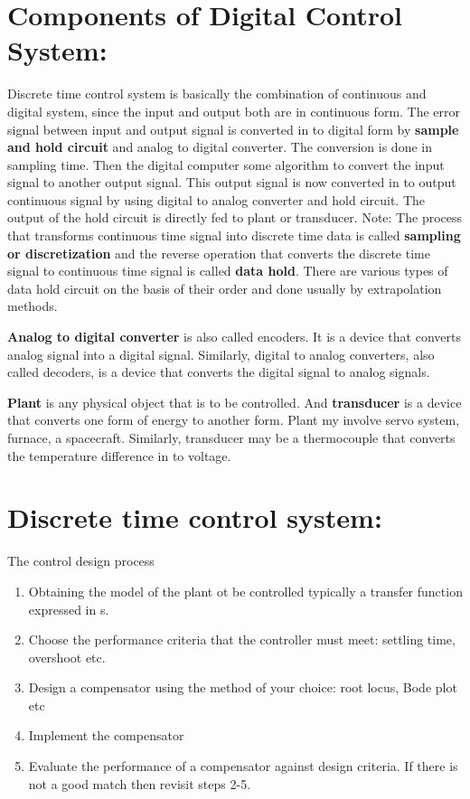 \documentclass{article}
\begin{document}
\section{Components of Digital Control System:}
Discrete time control system is basically the combination of continuous and digital system, since the input and output both are in continuous form. The error signal between input and output signal is converted in to digital form by \textbf{sample and hold circuit} and analog to digital converter. The conversion is done in sampling time. Then the digital computer some algorithm to convert the input signal to another output signal. This output signal is now converted in to output continuous signal by using digital to analog converter and hold circuit. The output of the hold circuit is directly fed to plant or transducer.
Note: The process that transforms continuous time signal into discrete time data is called \textbf{sampling or discretization} and the reverse operation that converts the discrete time signal to continuous time signal is called \textbf{data hold}. There are various types of data hold circuit on the basis of their order and done usually by extrapolation methods.

\textbf{Analog to digital converter} is also called encoders. It is a device that converts analog signal into a digital signal. Similarly, digital to analog converters, also called decoders, is a device that converts the digital signal to analog signals.

\textbf{Plant} is any physical object that is to be controlled. And \textbf{transducer} is a device that converts one form of energy to another form. Plant my involve servo system, furnace, a spacecraft. Similarly, transducer may be a thermocouple that converts the temperature difference in to voltage.


\section{Discrete time control system:}
The control design process
\begin{enumerate}
	\item Obtaining the model of the plant ot be controlled typically a transfer function expressed in s.
	\item Choose the performance criteria that the controller must meet: settling time, overshoot etc.
	\item Design a compensator using the method of your choice: root locus, Bode plot etc
	\item Implement the compensator
	\item Evaluate the performance of a compensator against design criteria. If there is not a good match then revisit steps 2-5.
\end{enumerate}
\end{document}
